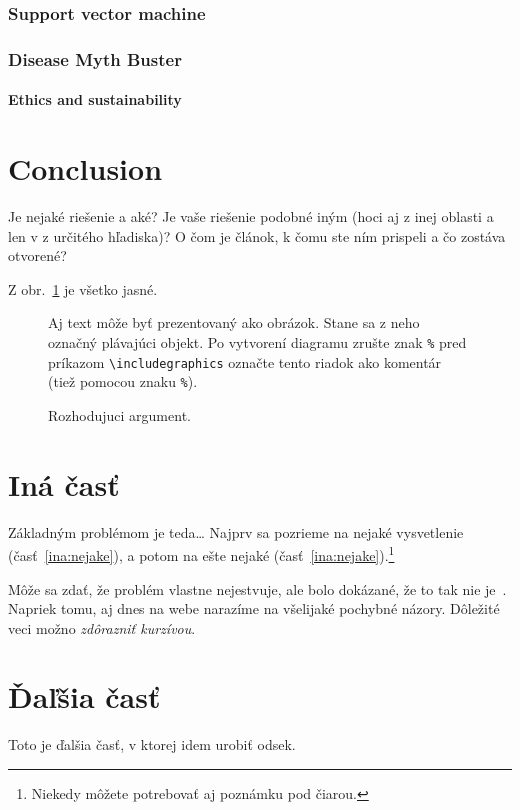 \documentclass[11pt ,english,a4paper]{article}
\begin{document}
\subsubsection{Support vector machine}

\subsubsection{Disease Myth Buster}

\paragraph{Ethics and sustainability}%

\section{Conclusion}\label{conclusion}

Je nejaké riešenie a aké?
Je vaše riešenie podobné iným (hoci aj z inej oblasti a len v z určitého hľadiska)?
O čom je článok, k čomu ste ním prispeli a čo zostáva otvorené?

Z obr.~\ref{f:rozhod} je všetko jasné. 

\begin{figure}[tbh]
\centering
Aj text môže byť prezentovaný ako obrázok. Stane sa z neho označný plávajúci objekt. Po vytvorení diagramu zrušte znak \texttt{\%} pred príkazom \verb|\includegraphics| označte tento riadok ako komentár (tiež pomocou znaku \texttt{\%}).
\caption{Rozhodujuci argument.}
\label{f:rozhod}
\end{figure}



\section{Iná časť} \label{ina}

Základným problémom je teda\ldots{} Najprv sa pozrieme na nejaké vysvetlenie (časť~\ref{ina:nejake}), a potom na ešte nejaké (časť~\ref{ina:nejake}).\footnote{Niekedy môžete potrebovať aj poznámku pod čiarou.}

Môže sa zdať, že problém vlastne nejestvuje\cite{bar21health}, ale bolo dokázané, že to tak nie je~\cite{bar21health}. Napriek tomu, aj dnes na webe narazíme na všelijaké pochybné názory\cite{bar21health}. Dôležité veci možno \emph{zdôrazniť kurzívou}.

\section{Ďaľšia časť}
Toto je ďalšia časť, v ktorej idem urobiť odsek.
\end{document}

